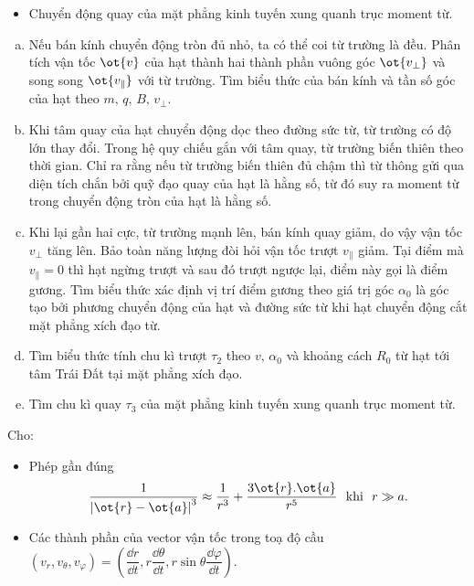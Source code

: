 \begin{vd}
\begin{enumerate}[1)]
\begin{itemize}
\begin{center}
        \end{center}
        \item Chuyển động quay của mặt phẳng kinh tuyến xung quanh trục moment từ.
    \end{itemize}
        \begin{enumerate}[a)]
            \item Nếu bán kính chuyển động tròn đủ nhỏ, ta có thể coi từ trường là đều. Phân tích vận tốc $\ot{v}$ của hạt thành hai thành phần vuông góc ${{\ot{v_{\perp}}}}$ và song song ${{\ot{v_{\parallel}}}}$ với từ trường. Tìm biểu thức của bán kính và tần số góc của hạt theo $m,\,q,\,B,\,{{v}_{\perp }}$.
            \item Khi tâm quay của hạt chuyển động dọc theo đường sức từ, từ trường có độ lớn thay đổi. Trong hệ quy chiếu gắn với tâm quay, từ trường biến thiên theo thời gian. Chỉ ra rằng nếu từ trường biến thiên đủ chậm thì từ thông gửi qua diện tích chắn bởi quỹ đạo quay của hạt là hằng số, từ đó suy ra moment từ trong chuyển động tròn của hạt là hằng số.
            \item Khi lại gần hai cực, từ trường mạnh lên, bán kính quay giảm, do vậy vận tốc ${{v}_{\perp }}$ tăng lên. Bảo toàn năng lượng đòi hỏi vận tốc trượt ${{v}_{\parallel}}$ giảm. Tại điểm mà ${{v}_{\parallel}}=0$ thì hạt ngừng trượt và sau đó trượt ngược lại, điểm này gọi là điểm gương. Tìm biểu thức xác định vị trí điểm gương theo giá trị góc ${{\alpha }_{0}}$ là góc tạo bởi phương chuyển động của hạt và đường sức từ khi hạt chuyển động cắt mặt phẳng xích đạo từ.
            \item Tìm biểu thức tính chu kì trượt ${{\tau }_{2}}$ theo $v,\,{{\alpha }_{0}}$ và khoảng cách ${{R}_{0}}$ từ hạt tới tâm Trái Đất tại mặt phẳng xích đạo.
            \item Tìm chu kì quay ${{\tau }_{3}}$ của mặt phẳng kinh tuyến xung quanh trục moment từ.
        \end{enumerate}
    \end{enumerate}
    Cho:
    \begin{itemize}
        \item Phép gần đúng \[\dfrac{1}{{{\left| \ot{r}-\ot{a} \right|}^{3}}}\approx \dfrac{1}{{{r}^{3}}}+\dfrac{3\ot{r}.\ot{a}}{{{r}^{5}}} \ \text{ khi } \ r\gg a.\]
        \item Các thành phần của vector vận tốc trong toạ độ cầu $\left( {{v}_{r}},{{v}_{\theta }},{{v}_{\varphi }} \right)=\left( \dfrac{\dd r}{\dd t},r\dfrac{\dd\theta }{\dd t},r\sin \theta \dfrac{\dd\varphi }{\dd t} \right)$.
    \end{itemize}
\end{vd}
